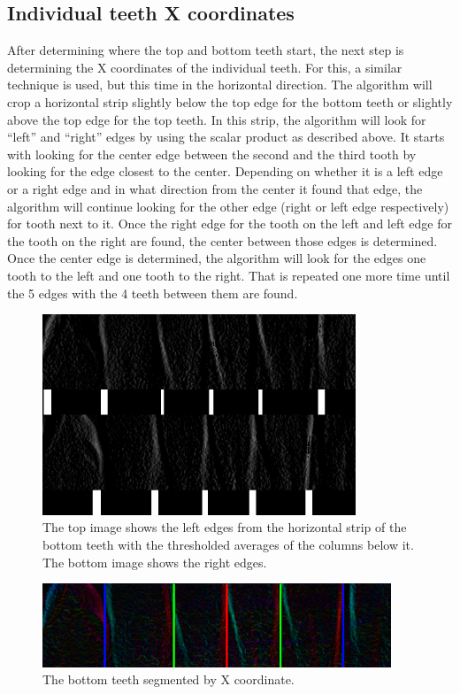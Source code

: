 \documentclass[a4paper,10pt]{article}
\begin{document}
\subsection{Individual teeth X coordinates}
After determining where the top and bottom teeth start, the next step is determining the X coordinates of the individual teeth. For this, a similar technique is used, but this time in the horizontal direction. The algorithm will crop a horizontal strip slightly below the top edge for the bottom teeth or slightly above the top edge for the top teeth. In this strip, the algorithm will look for ``left'' and ``right'' edges  by using the scalar product as described above. It starts with looking for the center edge between the second and the third tooth by looking for the edge closest to the center. Depending on whether it is a left edge or a right edge and in what direction from the center it found that edge, the algorithm will continue looking for the other edge (right or left edge respectively) for tooth next to it. Once the right edge for the tooth on the left and left edge for the tooth on the right are found, the center between those edges is determined. Once the center edge is determined, the algorithm will look for the edges one tooth to the left and one tooth to the right. That is repeated one more time until the 5 edges with the 4 teeth between them are found.

\begin{figure}[]
\centering
\includegraphics[height=60mm]{teeth_horizontal_1.png}
 \caption{The top image shows the left edges from the horizontal strip of the bottom teeth with the thresholded averages of the columns below it. The bottom image shows the right edges.}
\end{figure}
 


\begin{figure}[]
\centering
\includegraphics[height=25mm]{teeth_horizontal_2.png}
 \caption{The bottom teeth segmented by X coordinate.}
\end{figure}
\end{document}
